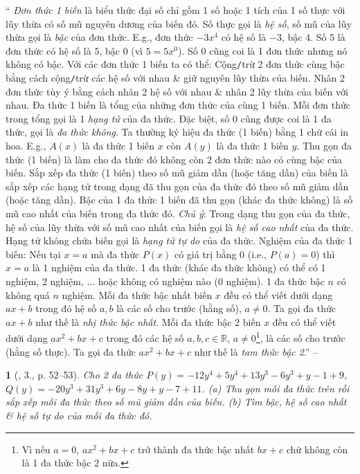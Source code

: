 \documentclass{article}
\newtheorem{baitoan}{}
\begin{document}
`` \textit{Đơn thức 1 biến} là biểu thức đại số chỉ gồm 1 số hoặc 1 tích của 1 số thực với lũy thừa có số mũ nguyên dương của biến đó. Số thực gọi là \textit{hệ số}, số mũ của lũy thừa gọi là \textit{bậc} của đơn thức. E.g., đơn thức $-3x^4$ có hệ số là $-3$, bậc $4$. Số $5$ là đơn thức có hệ số là $5$, bậc $0$ (vì $5 = 5x^0$). Số $0$ cũng coi là 1 đơn thức nhưng nó không có bậc.  Với các đơn thức 1 biến ta có thể: Cộng\texttt{/}trừ 2 đơn thức cùng bậc bằng cách cộng\texttt{/}trừ các hệ số với nhau \& giữ nguyên lũy thừa của biến. Nhân 2 đơn thức tùy ý bằng cách nhân 2 hệ số với nhau \& nhân 2 lũy thừa của biến với nhau.  Đa thức 1 biến là tổng của những đơn thức của cùng 1 biến. Mỗi đơn thức trong tổng gọi là 1 \textit{hạng tử} của đa thức. Đặc biệt, số 0 cũng được coi là 1 đa thức, gọi là \textit{đa thức không}. Ta thường ký hiệu đa thức (1 biến) bằng 1 chữ cái in hoa. E.g., $A(x)$ là đa thức 1 biến $x$ còn $A(y)$ là đa thức 1 biến $y$.  Thu gọn đa thức (1 biến) là làm cho đa thức đó không còn 2 đơn thức nào có cùng bậc của biến. Sắp xếp đa thức (1 biến) theo số mũ giảm dần (hoặc tăng dần) của biến là sắp xếp các hạng tử trong dạng đã thu gọn của đa thức đó theo số mũ giảm dần (hoặc tăng dần).  Bậc của 1 đa thức 1 biến đã thu gọn (khác đa thức không) là số mũ cao nhất của biến trong đa thức đó. \textit{Chú ý}: Trong dạng thu gọn của đa thức, hệ số của lũy thừa với số mũ cao nhất của biến gọi là \textit{hệ số cao nhất} của đa thức. Hạng tử không chứa biến gọi là \textit{hạng tử tự do} của đa thức.  Nghiệm của đa thức 1 biến: Nếu tại $x = a$ mà đa thức $P(x)$ có giá trị bằng $0$ (i.e., $P(a) = 0$) thì $x = a$ là 1 nghiệm của đa thức.  1 đa thức (khác đa thức không) có thể có 1 nghiệm, 2 nghiệm, $\ldots$ hoặc không có nghiệm nào (0 nghiệm). 1 đa thức bậc $n$ có không quá $n$ nghiệm.  Mỗi đa thức bậc nhất biến $x$ đều có thể viết dưới dạng $ax + b$ trong đó hệ số $a,b$ là các số cho trước (hằng số), $a\ne0$. Ta gọi đa thức $ax + b$ như thế là \textit{nhị thức bậc nhất}. Mỗi đa thức bậc 2 biến $x$ đều có thể viết dưới dạng $ax^2 + bx + c$ trong đó các hệ số $a,b,c\in\mathbb{R}$, $a\ne 0$\footnote{Vì nếu $a = 0$, $ax^2 + bx + c$ trở thành đa thức bậc nhất $bx + c$ chứ không còn là 1 đa thức bậc 2 nữa.}, là các số cho trước (hằng số thực). Ta gọi đa thức $ax^2 + bx + c$ như thế là \textit{tam thức bậc 2}.'' -- \cite[Chap. III, \S2, p. 39]{Tuyen_Toan_7}

\begin{baitoan}[\cite{SGK_Toan_7_Canh_Dieu_tap_2}, 3., p. 52--53]
	Cho 2 đa thức $P(y) = -12y^4 + 5y^4 + 13y^3 - 6y^3 + y -1 + 9$, $Q(y) = -20y^3 + 31y^3 + 6y - 8y + y - 7 + 11$. (a) Thu gọn mỗi đa thức trên rồi sắp xếp mỗi đa thức theo số mũ giảm dần của biến. (b) Tìm bậc, hệ số cao nhất \& hệ số tự do của mỗi đa thức đó.
\end{baitoan}
\end{document}
